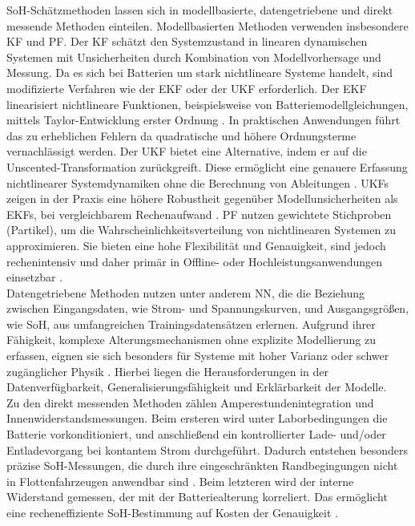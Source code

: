 \acs{SoH}-Schätzmethoden lassen sich in modellbasierte, datengetriebene und direkt messende Methoden einteilen.
Modellbasierten Methoden verwenden insbesondere \ac{KF} und \ac{PF}. Der \acs{KF} schätzt den Systemzustand in linearen dynamischen Systemen mit Unsicherheiten durch Kombination von Modellvorhersage und Messung. Da es sich bei Batterien um stark nichtlineare Systeme handelt, sind modifizierte Verfahren wie der \ac{EKF} oder der \ac{UKF} erforderlich. Der \acs{EKF} linearisiert nichtlineare Funktionen, beispielsweise von Batteriemodellgleichungen, mittels Taylor-Entwicklung erster Ordnung \cite{urlIdEKF}. In praktischen Anwendungen führt das zu erheblichen Fehlern da quadratische und höhere Ordnungsterme vernachlässigt werden. Der \acs{UKF} bietet eine Alternative, indem er auf die Unscented-Transformation zurückgreift. Diese ermöglicht eine genauere Erfassung nichtlinearer Systemdynamiken ohne die Berechnung von Ableitungen \cite{urlIdUKF}. \acs{UKF}s zeigen in der Praxis eine höhere Robustheit gegenüber Modellunsicherheiten als EKFs, bei vergleichbarem Rechenaufwand \cite{urlIdEKFvsUKF}. \acs{PF} nutzen gewichtete Stichproben (Partikel), um die Wahrscheinlichkeitsverteilung von nichtlinearen Systemen zu approximieren. Sie bieten eine hohe Flexibilität und Genauigkeit, sind jedoch rechenintensiv und daher primär in Offline- oder Hochleistungsanwendungen einsetzbar \cite{urlIdPF}.
\\
Datengetriebene Methoden nutzen unter anderem \ac{NN}, die die Beziehung zwischen Eingangsdaten, wie Strom- und Spannungskurven, und Ausgangsgrößen, wie \acs{SoH}, aus umfangreichen Trainingsdatensätzen erlernen. Aufgrund ihrer Fähigkeit, komplexe Alterungsmechanismen ohne explizite Modellierung zu erfassen, eignen sie sich besonders für Systeme mit hoher Varianz oder schwer zugänglicher Physik \cite{urlIdNNfürRUL}. Hierbei liegen die Herausforderungen in der Datenverfügbarkeit, Generalisierungsfähigkeit und Erklärbarkeit der Modelle.
\\
Zu den direkt messenden Methoden zählen Amperestundenintegration und Innenwiderstandsmessungen. Beim ersteren wird unter Laborbedingungen die Batterie vorkonditioniert, und anschließend ein kontrollierter Lade- und/oder Entladevorgang bei kontantem Strom durchgeführt. Dadurch entstehen besonders präzise \acs{SoH}-Messungen, die durch ihre eingeschränkten Randbegingungen nicht in Flottenfahrzeugen anwendbar sind \cite{SOHCoulombCounting}. Beim letzteren wird der interne Widerstand gemessen, der mit der Batteriealterung korreliert. Das ermöglicht eine recheneffiziente \acs{SoH}-Bestimmung auf Kosten der Genauigkeit \cite{SOHInternalResistance}.

